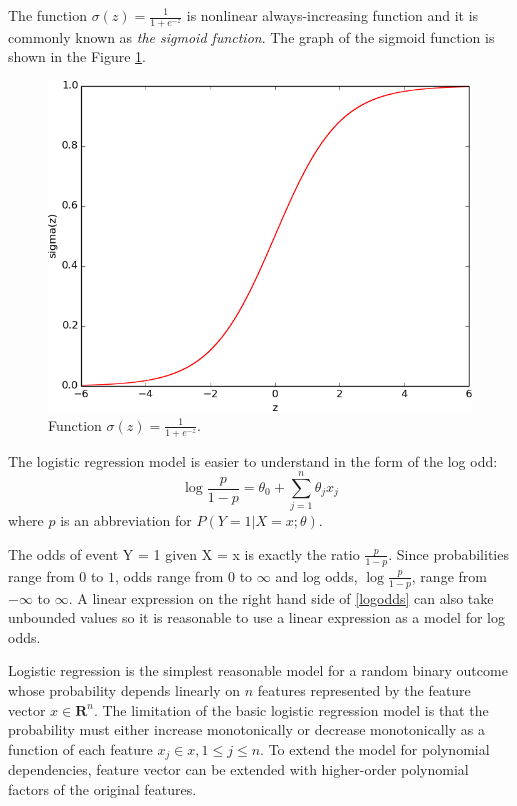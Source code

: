 \documentclass[times, utf8, zavrsni]{fer}
\begin{document}
The function $\sigma(z) = \frac{1}{1 + e ^ {-z}}$ is nonlinear always-increasing function  and it is commonly known as \emph{the sigmoid function}. The graph of the sigmoid function is shown in the Figure \ref{sig}.
\begin{figure}[htp]
\centering
\includegraphics[scale=0.59]{figs/sig.png}
\caption{Function $\sigma(z) = \frac{1}{1 + e ^ {-z}}$.}
\label{sig}
\end{figure}

The logistic  regression model is easier to understand in the form of the log odd:
\begin{equation}
\log \frac{p}{1 - p} = \theta_0 + \sum_{j = 1}^n \theta_j x_j
\label{logodds}
\end{equation}
where $p$ is an abbreviation for $P(Y = 1 | X =x; \theta)$.

The odds of event Y = 1 given  X = x is exactly the ratio $\frac{p}{1 - p}$.  Since probabilities range from $0$ to $1$, odds range from $0$ to $\infty$ and log odds, $\log\frac{p}{1 - p}$, range from $-\infty$ to $\infty$. A linear expression on the right hand side of \eqref{logodds} can also take unbounded values so it is reasonable to use  a linear  expression as a model for log odds.

Logistic regression is the simplest reasonable model for a random binary outcome whose probability depends linearly on $n$ features represented by the feature vector $x \in \mathbf{R}^n$.  The limitation of the basic logistic regression model is that the probability must either increase monotonically or decrease monotonically as a function of each feature $x_j \in x, 1 \leq j \leq n$. To extend the model for polynomial dependencies, feature vector can be extended with higher-order polynomial factors of the original features. 
\end{document}
